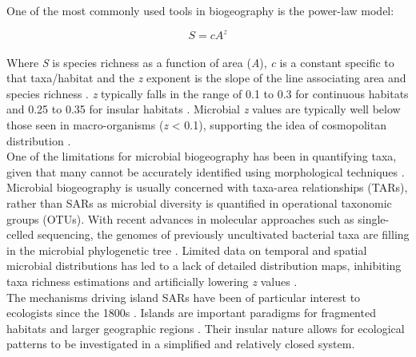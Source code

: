 \noindent One of the most commonly used tools in biogeography is the power-law model:

\begin{equation}
S=cA^{z}
\end{equation}\\

\noindent Where \textit{S} is species richness as a function of area (\textit{A}), \textit{c} is a constant specific to that taxa/habitat and the \textit{z} exponent is the slope of the line associating area and species richness \cite{darcy2018island}. \textit{z} typically falls in the range of 0.1 to 0.3 for continuous habitats and 0.25 to 0.35 for insular habitats \cite{GreenJessica2006Ssom}. Microbial \textit{z} values are typically well below those seen in macro-organisms (\textit{z} < 0.1), supporting the idea of cosmopolitan distribution \cite{GreenJessica2006Ssom}. \\

\noindent One of the limitations for microbial biogeography has been in quantifying taxa, given that many cannot be accurately identified using morphological techniques \cite{GreenJessica2006Ssom}. Microbial biogeography is usually concerned with taxa-area relationships (TARs), rather than SARs as microbial diversity is quantified in operational taxonomic groups (OTUs). With recent advances in molecular approaches such as single-celled sequencing, the genomes of previously uncultivated bacterial taxa are filling in the microbial phylogenetic tree \cite{lasken2014recent}. Limited data on temporal and spatial microbial distributions has led to a lack of detailed distribution maps, inhibiting taxa richness estimations and artificially lowering \textit{z} values \cite{GreenJessica2006Ssom}.\\


\noindent The mechanisms driving island SARs have been of particular interest to ecologists since the 1800s \cite{macdonald2018theory}. Islands are important paradigms for fragmented habitats and larger geographic regions \cite{simberloff1974equilibrium}. Their insular nature allows for ecological patterns to be investigated in a simplified and relatively closed system. \\


